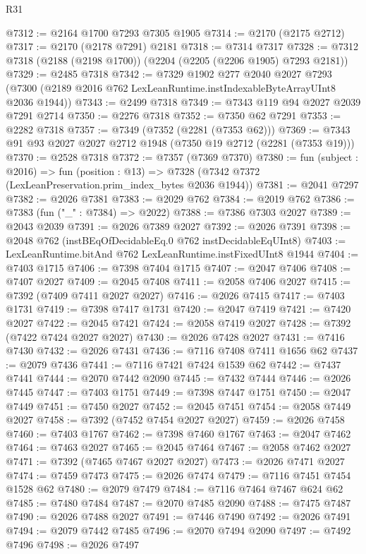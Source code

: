 \begin{lexlean}{R31}
\begin{coremodule}
@7312 := @2164 @1700 @7293 @7305 @1905
@7314 := @2170 (@2175 @2712)
@7317 := @2170 (@2178 @7291) @2181
@7318 := @7314 @7317
@7328 := @7312 @7318 (@2188 (@2198 @1700)) (@2204 (@2205 (@2206 @1905) @7293 @2181))
@7329 := @2485 @7318
@7342 := @7329
    @1902
    @277
    @2040
    @2027
    @7293
    (@7300 (@2189 @2016 @762 LexLeanRuntime.instIndexableByteArrayUInt8 @2036 @1944))
@7343 := @2499 @7318
@7349 := @7343 @119 @94 @2027 @2039 @7291 @2714
@7350 := @2276 @7318
@7352 := @7350 @62 @7291
@7353 := @2282 @7318
@7357 := @7349 (@7352 (@2281 (@7353 @62)))
@7369 := @7343 @91 @93 @2027 @2027 @2712 @1948 (@7350 @19 @2712 (@2281 (@7353 @19)))
@7370 := @2528 @7318
@7372 := @7357 (@7369 @7370)
@7380 := fun (subject : @2016) =>
  fun (position : @13) => @7328 (@7342 @7372 (LexLeanPreservation.prim_index_bytes @2036 @1944))
@7381 := @2041 @7297
@7382 := @2026 @7381
@7383 := @2029 @762
@7384 := @2019 @762
@7386 := @7383 (fun ("_" : @7384) => @2022)
@7388 := @7386 @7303 @2027
@7389 := @2043 @2039
@7391 := @2026 @7389 @2027
@7392 := @2026 @7391
@7398 := @2048 @762 (instBEqOfDecidableEq.{0} @762 instDecidableEqUInt8)
@7403 := LexLeanRuntime.bitAnd @762 LexLeanRuntime.instFixedUInt8 @1944
@7404 := @7403 @1715
@7406 := @7398 @7404 @1715
@7407 := @2047 @7406
@7408 := @7407 @2027
@7409 := @2045 @7408
@7411 := @2058 @7406 @2027
@7415 := @7392 (@7409 @7411 @2027 @2027)
@7416 := @2026 @7415
@7417 := @7403 @1731
@7419 := @7398 @7417 @1731
@7420 := @2047 @7419
@7421 := @7420 @2027
@7422 := @2045 @7421
@7424 := @2058 @7419 @2027
@7428 := @7392 (@7422 @7424 @2027 @2027)
@7430 := @2026 @7428 @2027
@7431 := @7416 @7430
@7432 := @2026 @7431
@7436 := @7116 @7408 @7411 @1656 @62
@7437 := @2079 @7436
@7441 := @7116 @7421 @7424 @1539 @62
@7442 := @7437 @7441
@7444 := @2070 @7442 @2090
@7445 := @7432 @7444
@7446 := @2026 @7445
@7447 := @7403 @1751
@7449 := @7398 @7447 @1751
@7450 := @2047 @7449
@7451 := @7450 @2027
@7452 := @2045 @7451
@7454 := @2058 @7449 @2027
@7458 := @7392 (@7452 @7454 @2027 @2027)
@7459 := @2026 @7458
@7460 := @7403 @1767
@7462 := @7398 @7460 @1767
@7463 := @2047 @7462
@7464 := @7463 @2027
@7465 := @2045 @7464
@7467 := @2058 @7462 @2027
@7471 := @7392 (@7465 @7467 @2027 @2027)
@7473 := @2026 @7471 @2027
@7474 := @7459 @7473
@7475 := @2026 @7474
@7479 := @7116 @7451 @7454 @1528 @62
@7480 := @2079 @7479
@7484 := @7116 @7464 @7467 @624 @62
@7485 := @7480 @7484
@7487 := @2070 @7485 @2090
@7488 := @7475 @7487
@7490 := @2026 @7488 @2027
@7491 := @7446 @7490
@7492 := @2026 @7491
@7494 := @2079 @7442 @7485
@7496 := @2070 @7494 @2090
@7497 := @7492 @7496
@7498 := @2026 @7497

\end{coremodule}
\end{lexlean}
